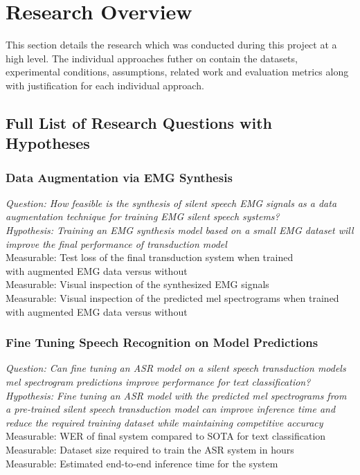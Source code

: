 \chapter{Research Overview} \label{chap:research-overview}

This section details the research which was conducted during this project
at a high level. The individual approaches futher on contain the datasets,
experimental conditions, assumptions, related work and evaluation metrics
along with justification for each individual approach.

\section{Full List of Research Questions with Hypotheses}

\subsection{Data Augmentation via EMG Synthesis}
\textit{Question: How feasible is the synthesis of silent speech EMG signals
as a data augmentation technique for training EMG silent speech systems?} \\
\textit{Hypothesis: Training an EMG synthesis model based on a small
EMG dataset will improve the final performance of transduction model} \\
Measurable: Test loss of the final transduction system when trained\\
with augmented EMG data versus without\\
Measurable: Visual inspection of the synthesized EMG signals\\
Measurable: Visual inspection of the predicted mel spectrograms when
trained with augmented EMG data versus without\\

\subsection{Fine Tuning Speech Recognition on Model Predictions }
\textit{Question: Can fine tuning an ASR model on a silent speech
transduction models mel spectrogram predictions improve performance for
text classification?} \\
\textit{Hypothesis: Fine tuning an ASR model with the predicted
mel spectrograms from a pre-trained silent speech transduction model
can improve inference time and reduce the required training dataset
while maintaining competitive accuracy} \\
Measurable: WER of final system compared to SOTA for text classification \\
Measurable: Dataset size required to train the ASR system in hours \\
Measurable: Estimated end-to-end inference time for the system